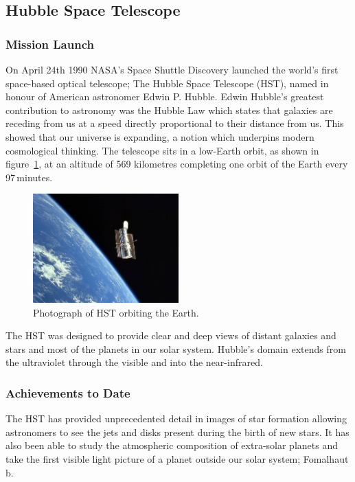 
\subsection{Hubble Space Telescope} %
\label{sub:hubble_space_telescope}

	\subsubsection{Mission Launch} %
	\label{ssub:mission_launch}
		On April 24th 1990 NASA’s Space Shuttle Discovery launched the world’s first space-based optical telescope; The Hubble Space Telescope (HST), named in honour of American astronomer Edwin P. Hubble. Edwin Hubble’s greatest contribution to astronomy was the Hubble Law which states that galaxies are receding from us at a speed directly proportional to their distance from us. This showed that our universe is expanding, a notion which underpins modern cosmological thinking. The telescope sits in a low-Earth orbit, as shown in figure~\ref{fig:hubble_space_telescope}, at an altitude of 569 kilometres completing one orbit of the Earth every 97\,minutes\cite{Hubsite_1}.
		\begin{figure}[ht]
			\centering
			\includegraphics[width=0.5\textwidth]{../Images/Hubble_Space_Telescope.jpg}
			\caption{Photograph of HST orbiting the Earth.\label{fig:hubble_space_telescope}}
		\end{figure}

		The HST was designed to provide clear and deep views of distant galaxies and stars and most of the planets in our solar system. Hubble's domain extends from the ultraviolet through the visible and into the near-infrared\cite{NASA_1}.

	\subsubsection{Achievements to Date} %
	\label{ssub:achievements_to_date}
		The HST has provided unprecedented detail in images of star formation allowing astronomers to see the jets and disks present during the birth of new stars. It has also been able to study the atmospheric composition of extra-solar planets and take the first visible light picture of a planet outside our solar system; Fomalhaut b\cite{Hubsite_3}.


